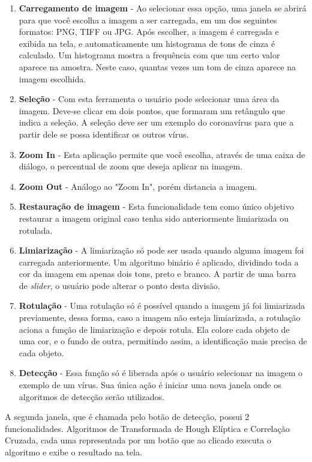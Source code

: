 \documentclass[conference, brazil]{IEEEtran}
\begin{document}
\begin{enumerate}
\item\textbf{Carregamento de imagem} - Ao selecionar essa opção, uma janela se abrirá para que você escolha a imagem a ser carregada, em um dos seguintes formatos: PNG, TIFF ou JPG. Após escolher, a imagem é carregada e exibida na tela, e automaticamente um histograma de tons de cinza é calculado. Um histograma mostra a frequência com que um certo valor aparece na amostra. Neste caso, quantas vezes um tom de cinza aparece na imagem escolhida.
\item\textbf{Seleção} - Com esta ferramenta o usuário pode selecionar uma área da imagem. Deve-se clicar em dois pontos, que formaram um retângulo que indica a seleção. A seleção deve ser um exemplo do coronavírus para que a partir dele se possa identificar os outros vírus.
\item\textbf{Zoom In} - Esta aplicação permite que você escolha, através de uma caixa de diálogo, o percentual de zoom que deseja aplicar na imagem.
\item\textbf{Zoom Out} - Análogo ao "Zoom In", porém distancia a imagem.
\item\textbf{Restauração de imagem} - Esta funcionalidade tem como único objetivo restaurar a imagem original caso tenha sido anteriormente limiarizada ou rotulada.
\item\textbf{Limiarização} - A limiarização só pode ser usada quando alguma imagem foi carregada anteriormente. Um algoritmo binário é aplicado, dividindo toda a cor da imagem em apenas dois tons, preto e branco. A partir de uma barra de \textit{slider}, o usuário pode alterar o ponto desta divisão.
\item\textbf{Rotulação} - Uma rotulação só é possível quando a imagem já foi limiarizada previamente, dessa forma, caso a imagem não esteja limiarizada, a rotulação aciona a função de limiarização e depois rotula. Ela colore cada objeto de uma cor, e o fundo de outra, permitindo assim, a identificação mais precisa de cada objeto.
\item\textbf{Detecção} - Essa função só é liberada após o usuário selecionar na imagem o exemplo de um vírus. Sua única ação é iniciar uma nova janela onde os algoritmos de detecção serão utilizados.

\end{enumerate}

A segunda janela, que é chamada pelo botão de detecção, possui 2 funcionalidades. Algoritmos de Transformada de Hough Elíptica e Correlação Cruzada, cada uma representada por um botão que ao clicado executa o algoritmo e exibe o resultado na tela.
\end{document}
